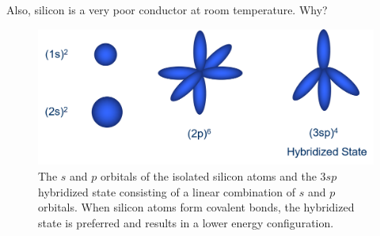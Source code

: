 Also, silicon is a very poor conductor at room temperature. Why?
\begin{figure}[tb]
\centering
\includegraphics[width=\columnwidth]{slide20}
\caption{The $s$ and $p$ orbitals of the isolated silicon atoms and the $3sp$ hybridized state consisting of a linear combination of $s$ and $p$ orbitals.  When silicon atoms form covalent bonds, the hybridized state is preferred and results in a lower energy configuration.}
\label{fig:slide20}
\end{figure}
\newpage

